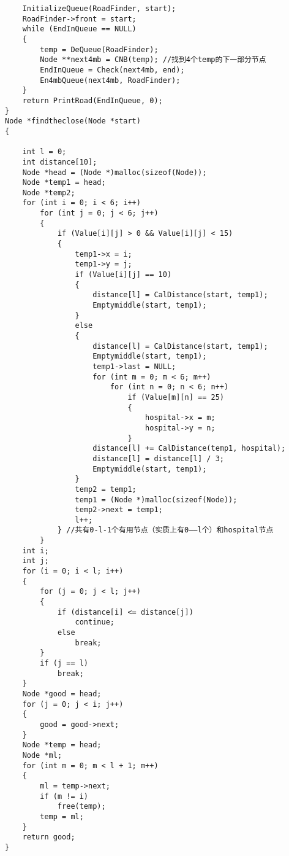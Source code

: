 \documentclass[UTF8]{ctexart}
\begin{document}
\begin{lstlisting}
    InitializeQueue(RoadFinder, start);
    RoadFinder->front = start;
    while (EndInQueue == NULL)
    {
        temp = DeQueue(RoadFinder);
        Node **next4mb = CNB(temp); //找到4个temp的下一部分节点
        EndInQueue = Check(next4mb, end);
        En4mbQueue(next4mb, RoadFinder);
    }
    return PrintRoad(EndInQueue, 0);
}
Node *findtheclose(Node *start)
{

    int l = 0;
    int distance[10];
    Node *head = (Node *)malloc(sizeof(Node));
    Node *temp1 = head;
    Node *temp2;
    for (int i = 0; i < 6; i++)
        for (int j = 0; j < 6; j++)
        {
            if (Value[i][j] > 0 && Value[i][j] < 15)
            {
                temp1->x = i;
                temp1->y = j;
                if (Value[i][j] == 10)
                {
                    distance[l] = CalDistance(start, temp1);
                    Emptymiddle(start, temp1);
                }
                else
                {
                    distance[l] = CalDistance(start, temp1);
                    Emptymiddle(start, temp1);
                    temp1->last = NULL;
                    for (int m = 0; m < 6; m++)
                        for (int n = 0; n < 6; n++)
                            if (Value[m][n] == 25)
                            {
                                hospital->x = m;
                                hospital->y = n;
                            }
                    distance[l] += CalDistance(temp1, hospital);
                    distance[l] = distance[l] / 3;
                    Emptymiddle(start, temp1);
                }
                temp2 = temp1;
                temp1 = (Node *)malloc(sizeof(Node));
                temp2->next = temp1;
                l++;
            } //共有0-l-1个有用节点（实质上有0——l个）和hospital节点
        }
    int i;
    int j;
    for (i = 0; i < l; i++)
    {
        for (j = 0; j < l; j++)
        {
            if (distance[i] <= distance[j])
                continue;
            else
                break;
        }
        if (j == l)
            break;
    }
    Node *good = head;
    for (j = 0; j < i; j++)
    {
        good = good->next;
    }
    Node *temp = head;
    Node *ml;
    for (int m = 0; m < l + 1; m++)
    {
        ml = temp->next;
        if (m != i)
            free(temp);
        temp = ml;
    }
    return good;
}


\end{lstlisting}
\end{document}
